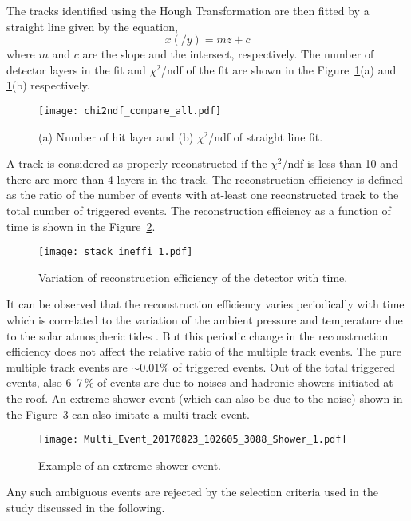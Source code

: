 The tracks identified using the Hough Transformation are then
fitted by a straight line given by the equation,
\begin{equation}
  x\left(/y\right)=mz+c \label{eq:plain}
\end{equation}
where $m$ and $c$ are the slope and the intersect, respectively.
The number of detector layers in the fit and $\chi^{2}$/ndf of
the fit are shown in the Figure~\ref{fig:chi2ndf}(a) and
\ref{fig:chi2ndf}(b) respectively.
\begin{figure}[h]
  \texttt{[image: chi2ndf\_compare\_all.pdf]} 
  \caption{(a) Number of hit layer and
    (b) $\chi^2$/ndf of straight line fit.}
  \label{fig:chi2ndf}
\end{figure}
A track is considered as properly reconstructed if the $\chi^{2}$/ndf
is less than 10 and there are more than 4 layers in the track.
The reconstruction efficiency is defined as the ratio of the number
of events with at-least one reconstructed track to the total number
of triggered events. The reconstruction efficiency as a function of 
time is shown in the Figure~\ref{fig:stackineffi}.
\begin{figure}[h]
  \texttt{[image: stack\_ineffi\_1.pdf]} 
  \caption{Variation of reconstruction efficiency of the detector
    with time.}
  \label{fig:stackineffi}
\end{figure}
It can be observed that the reconstruction efficiency varies
periodically with time which is correlated to the variation
of the ambient pressure and temperature due to the solar
atmospheric tides \cite{rpcleak}. But this periodic change in 
the reconstruction efficiency does not affect the relative ratio of
the multiple track events. The pure multiple track events are
$\sim$0.01\% of triggered events. Out of the total triggered events,
also 6--7\,\% of events are due to noises and hadronic showers
initiated at the roof.
An extreme shower event (which can also be due to the noise) shown
in the Figure~\ref{fig:eshower} can also imitate a multi-track event.
\begin{figure}[h]
\texttt{[image: Multi\_Event\_20170823\_102605\_3088\_Shower\_1.pdf]} 
 \caption{Example of an extreme shower event.}
 \label{fig:eshower}
\end{figure}
Any such ambiguous events are rejected by the selection criteria
used in the study discussed in the following.

